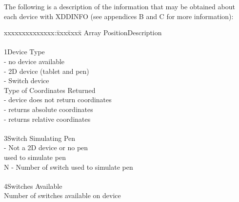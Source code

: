 The following is a description of the information that may be
obtained about each device with XDDINFO (see appendices B and C for more
information):
\begin{tabbing}
xxxxxxxxxxxxxx:\=xxx\=xxxx\=\kill
Array
Position\>Description\\
\\
1\>Device Type\\
\> - no device available\\
\> - 2D device (tablet and pen)\\
\> - Switch device\\
\>Type of Coordinates Returned\\
\> - device does not return coordinates\\
\> - returns absolute coordinates\\
\> - returns relative coordinates\\
\\ 
3\>Switch Simulating Pen\\
\> - Not a 2D device or no pen\\
\>\>\>used to simulate pen\\
\>\>N - Number of switch used to simulate pen\\
\\ 
4\>Switches Available\\
\>\>Number of switches available on device\\
\end{tabbing}
\newpage
